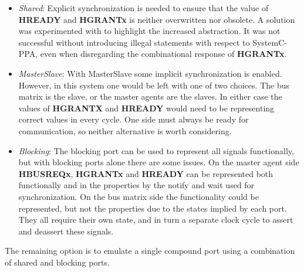 \begin{itemize}
 \item \textit{Shared}: Explicit synchronization is needed to ensure that the value of \textbf{HREADY} and \textbf{HGRANTx} is neither overwritten nor obsolete. A solution was experimented with to highlight the increased abstraction. It was not successful without introducing illegal statements with respect to SystemC-PPA, even when disregarding the combinational response of \textbf{HGRANTx}.   
 \item \textit{MasterSlave}: With MasterSlave some implicit synchronization is enabled. However, in this system one would be left with one of two choices. The bus matrix is the slave, or the master agents are the slaves. In either case the values of \textbf{HGRANTX} and \textbf{HREADY} would need to be representing correct values in every cycle. One side must always be ready for communication, so neither alternative is worth considering.  
 \item \textit{Blocking}: The blocking port can be used to represent all signals functionally, but with blocking ports alone there are some issues. On the master agent side \textbf{HBUSREQx}, \textbf{HGRANTx} and \textbf{HREADY} can be represented both functionally and in the properties by the notify and wait used for synchronization. On the bus matrix side the functionality could be represented, but not the properties due to the states implied by each port. They all require their own state, and in turn a separate clock cycle to assert and deassert these signals.
\end{itemize}

The remaining option is to emulate a single compound port using a combination of shared and blocking ports.

